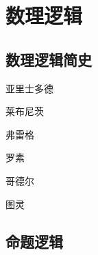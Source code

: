\chapter{数理逻辑}  \label{logic}

\section{数理逻辑简史}    \label{logic-history}

亚里士多德

莱布尼茨

弗雷格

罗素

哥德尔

图灵

\section{命题逻辑}  \label{prop-logic}
